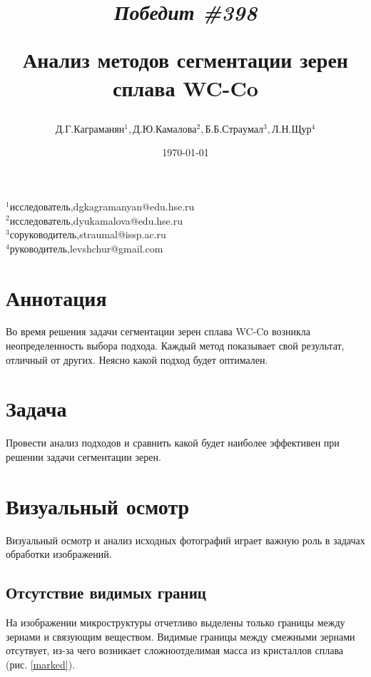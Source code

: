 \documentclass[a4paper, 14pt]{article}
\begin{document}
	\title{		\textbf{\textit{Победит \#398}} 
		
		Анализ методов сегментации зерен сплава WC-Co}

	\author{$ Д.Г. Каграманян^1, Д.Ю. Камалова^2, Б.Б. Страумал^3, Л.Н. Щур^4$}
	\date{\today}
	\maketitle

	\hfill
	\begin{minipage}{1\textwidth}
			\flushleft
	    $^1$исследователь,dgkagramanyan@edu.hse.ru\\
	    $^2$исследователь,dyukamalova@edu.hse.ru \\
	    $^3$соруководитель,straumal@issp.ac.ru\\
   	 	$^4$руководитель,levshchur@gmail.com\\



	\end{minipage}%

	\section{Аннотация}
	
	Во время решения задачи сегментации зерен сплава WC-Cо возникла неопределенность выбора подхода. 
	Каждый метод показывает свой результат, отличный от других. Неясно какой подход будет оптимален. 

	\section{Задача}
	
	Провести анализ подходов и сравнить какой будет наиболее эффективен при решении задачи сегментации зерен.
	
	\section{Визуальный осмотр}
	
	Визуальный осмотр и анализ исходных фотографий играет важную роль в задачах обработки изображений. 
	
	\subsection{Отсутствие видимых границ}  
	 На изображении микроструктуры отчетливо выделены только границы между зернами и связующим веществом. 
	 Видимые границы между смежными зернами отсутвует, из-за чего возникает сложноотделимая масса из
	  кристаллов сплава (рис. \ref{marked}). 
	 
\end{document}
